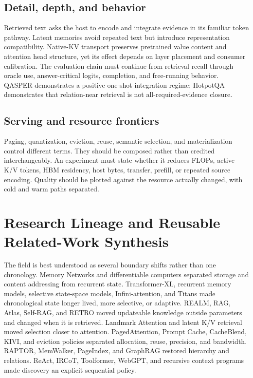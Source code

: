 \documentclass[10pt,a4paper]{article}
\begin{document}
\subsection{Detail, depth, and behavior}
Retrieved text asks the host to encode and integrate evidence in its familiar token pathway.
Latent memories avoid repeated text but introduce representation compatibility. Native-KV
transport preserves pretrained value content and attention head structure, yet its effect
depends on layer placement and consumer calibration. The evaluation chain must continue from
retrieval recall through oracle use, answer-critical logits, completion, and free-running
behavior. QASPER demonstrates a positive one-shot integration regime; HotpotQA demonstrates
that relation-near retrieval is not all-required-evidence closure.

\subsection{Serving and resource frontiers}
Paging, quantization, eviction, reuse, semantic selection, and materialization control
different terms. They should be composed rather than credited interchangeably. An experiment
must state whether it reduces FLOPs, active K/V tokens, HBM residency, host bytes, transfer,
prefill, or repeated source encoding. Quality should be plotted against the resource actually
changed, with cold and warm paths separated.

\section{Research Lineage and Reusable Related-Work Synthesis}

The field is best understood as several boundary shifts rather than one chronology. Memory
Networks and differentiable computers separated storage and content addressing from recurrent
state. Transformer-XL, recurrent memory models, selective state-space models, Infini-attention,
and Titans made chronological state longer lived, more selective, or adaptive. REALM, RAG,
Atlas, Self-RAG, and RETRO moved updateable knowledge outside parameters and changed when it is
retrieved. Landmark Attention and latent K/V retrieval moved selection closer to attention.
PagedAttention, Prompt Cache, CacheBlend, KIVI, and eviction policies separated allocation,
reuse, precision, and bandwidth. RAPTOR, MemWalker, PageIndex, and GraphRAG restored hierarchy
and relations. ReAct, IRCoT, Toolformer, WebGPT, and recursive context programs made discovery
an explicit sequential policy.
\end{document}
